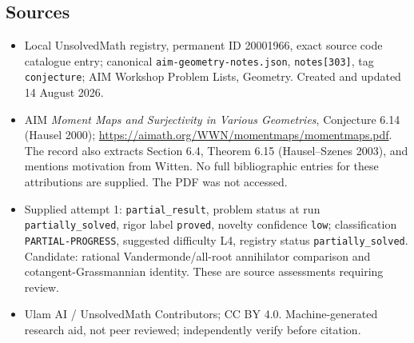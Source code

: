 \documentclass[11pt]{article}
\begin{document}
\subsection{Sources}
\begin{itemize}
\item Local UnsolvedMath registry, permanent ID 20001966, exact source code catalogue entry; canonical \texttt{aim-geometry-notes.json}, \texttt{notes[303]}, tag \texttt{conjecture}; AIM Workshop Problem Lists, Geometry. Created and updated 14 August 2026.
\item AIM \emph{Moment Maps and Surjectivity in Various Geometries}, Conjecture 6.14 (Hausel 2000); \url{https://aimath.org/WWN/momentmaps/momentmaps.pdf}. The record also extracts Section 6.4, Theorem 6.15 (Hausel--Szenes 2003), and mentions motivation from Witten. No full bibliographic entries for these attributions are supplied. The PDF was not accessed.
\item Supplied attempt 1: \texttt{partial\_result}, problem status at run \texttt{partially\_solved}, rigor label \texttt{proved}, novelty confidence \texttt{low}; classification \texttt{PARTIAL-PROGRESS}, suggested difficulty L4, registry status \texttt{partially\_solved}. Candidate: rational Vandermonde/all-root annihilator comparison and cotangent-Grassmannian identity. These are source assessments requiring review.
\item Ulam AI / UnsolvedMath Contributors; CC BY 4.0. Machine-generated research aid, not peer reviewed; independently verify before citation.
\end{itemize}
\end{document}
